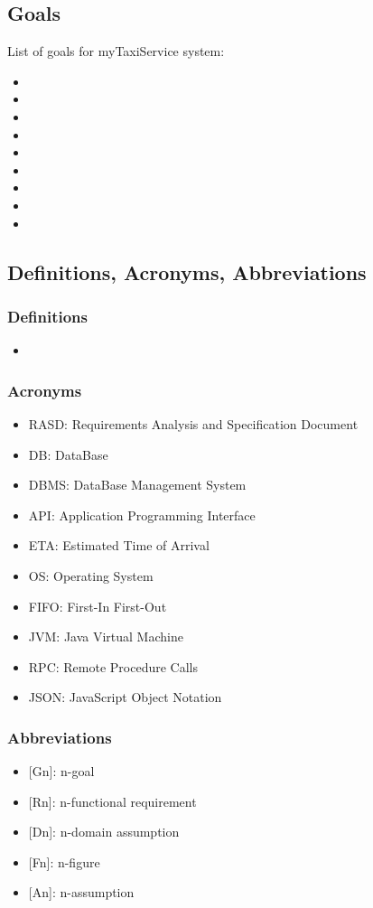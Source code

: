 \documentclass[a4paper,12pt]{article}%
\begin{document}
\subsection{Goals}
List of goals for myTaxiService system:
\begin{itemize}
\item {}
\item {}
\item {}
\item {}
\item {}
\item {}
\item {}
\item {} 
\item {} 
\end{itemize}
\subsection{Definitions, Acronyms, Abbreviations}
\subsubsection{Definitions}
\begin{itemize}
\item 
\end{itemize}
\subsubsection{Acronyms}
\begin{itemize}
\item RASD: Requirements Analysis and Specification Document
\item DB: DataBase
\item DBMS: DataBase Management System
\item API: Application Programming Interface
\item ETA: Estimated Time of Arrival
\item OS: Operating System
\item FIFO: First-In First-Out
\item JVM: Java Virtual Machine
\item RPC: Remote Procedure Calls
\item JSON: JavaScript Object Notation
\end{itemize}
\subsubsection{Abbreviations}
\begin{itemize}
\item {[}Gn{]}: n-goal %
\item {[}Rn{]}: n-functional requirement
\item {[}Dn{]}: n-domain assumption
\item {[}Fn{]}: n-figure
\item {[}An{]}: n-assumption
\end{itemize}
\end{document}
